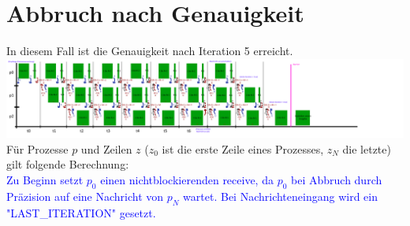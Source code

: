 \documentclass[a4paper,10pt,landscape]{article}
\begin{document}
\section*{Abbruch nach Genauigkeit}
In diesem Fall ist die Genauigkeit nach Iteration 5 erreicht.
\includegraphics[width=25cm]{gs_prec.png}
\newpage
Für Prozesse $p$ und Zeilen $z$ ($z_0$ ist die erste Zeile eines Prozesses, $z_N$ die letzte) gilt folgende Berechnung:\\
\textcolor{blue}{Zu Beginn setzt $p_0$ einen nichtblockierenden receive, da $p_0$ bei Abbruch durch Präzision auf eine Nachricht von $p_N$ wartet. Bei Nachrichteneingang wird ein "LAST\_ITERATION" gesetzt.}\\
\end{document}
